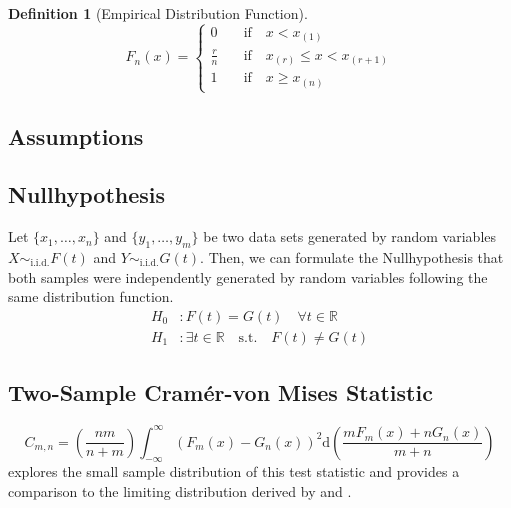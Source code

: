 \documentclass[12pt, a4paper]{article}
\theoremstyle{MAstyle} \newtheorem{assumption}{Assumption}[section]
\theoremstyle{MAstyle} \newtheorem{definition}{Definition}[section]
\theoremstyle{MAstyle} \newtheorem{theorem}{Theorem}[section]
\begin{document}
			\begin{definition}[Empirical Distribution Function]
				\begin{equation}
					F_{n}(x) = \begin{cases}
						0 & \quad \text{if} \quad  x < x_{(1)} \\
						\frac{r}{n} & \quad \text{if} \quad  x_{(r)} \leq x < x_{(r + 1)} \\
						1 & \quad \text{if} \quad  x \geq x_{(n)}
					\end{cases}
				\end{equation}
			\end{definition}
		
		\subsection{Assumptions}
		
		\subsection{Nullhypothesis}
			Let $\{x_1, \dots , x_n\}$ and $\{y_1, \dots , y_m\}$ be two data sets generated by random variables $X \sim_{\text{i.i.d.}} F(t)$ and $Y \sim_{\text{i.i.d.}} G(t)$.
			Then, we can formulate the Nullhypothesis that both samples were independently generated by random variables following the same distribution function.
			\begin{equation}
				\begin{split}
					H_0&: F(t) = G(t) \quad \forall t \in \mathbb{R}\\
					H_1&: \exists t \in \mathbb{R} \quad \text{s.t.} \quad F(t) \neq G(t)
				\end{split}
			\end{equation}
			
		\subsection{Two-Sample Cram\'{e}r-von Mises Statistic}
			
			\cite{buning_nichtparametrische_2013}
			\begin{equation}
				C_{m,n} = \left(\frac{nm}{n+m}\right) \int_{-\infty}^{\infty}\left(F_{m}(x) - G_{n}(x)\right)^{2} \mathrm{d} \left(\frac{m F_{m}(x) + n G_{n}(x)}{m+n}\right)
			\end{equation}
			\cite{anderson_distribution_1962} explores the small sample distribution of this test statistic and provides a comparison to the limiting distribution derived by \cite{rosenblatt_limit_1952} and \cite{fisz_result_1960}.
		
\end{document}
